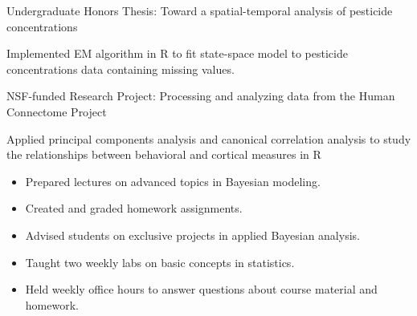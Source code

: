 \documentclass[9pt,a4paper]{altacv}
\begin{document}
\divider

\begin{project}{Undergraduate Honors Thesis: Toward a spatial-temporal analysis of pesticide concentrations}{\faChartLine}
  \item Implemented EM algorithm in R to fit state-space model to pesticide
  concentrations data containing missing values. 
\end{project}

\divider 

\begin{project}{NSF-funded Research Project: Processing and analyzing data from the Human Connectome Project}{\faChartLine}
  \item Applied principal components analysis and canonical correlation analysis
  to study the relationships between behavioral and cortical measures in R
\end{project}








\smallskip

\begin{itemize}
  \item Prepared lectures on advanced topics in Bayesian modeling.
  \item Created and graded homework assignments.
  \item Advised students on exclusive projects in applied Bayesian analysis.
  \item Taught two weekly labs on basic concepts in statistics.
  \item Held weekly office hours to answer questions about course material and homework. 
\end{itemize}

\end{document}
